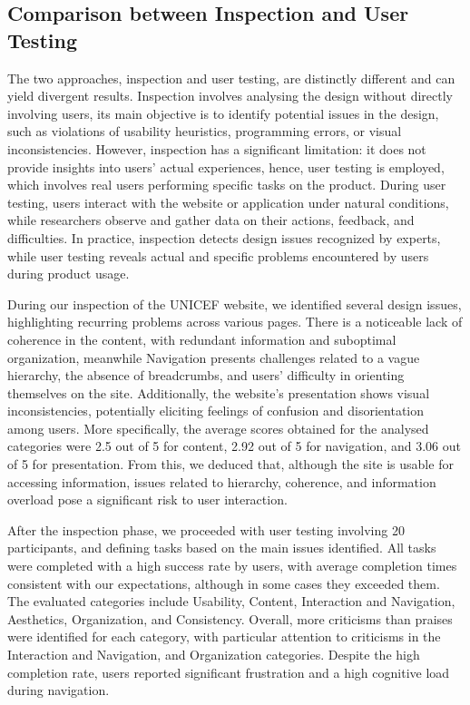 
\subsection{Comparison between Inspection and User Testing}
The two approaches, inspection and user testing, are distinctly different and can yield divergent results. Inspection involves analysing the design without directly involving users, its main objective is to identify potential issues in the design, such as violations of usability heuristics, programming errors, or visual inconsistencies. However, inspection has a significant limitation: it does not provide insights into users' actual experiences, hence, user testing is employed, which involves real users performing specific tasks on the product. During user testing, users interact with the website or application under natural conditions, while researchers observe and gather data on their actions, feedback, and difficulties. 
\newline In practice, inspection detects design issues recognized by experts, while user testing reveals actual and specific problems encountered by users during product usage.
\newline

During our inspection of the UNICEF website, we identified several design issues, highlighting recurring problems across various pages. There is a noticeable lack of coherence in the content, with redundant information and suboptimal organization, meanwhile Navigation presents challenges related to a vague hierarchy, the absence of breadcrumbs, and users' difficulty in orienting themselves on the site. Additionally, the website's presentation shows visual inconsistencies, potentially eliciting feelings of confusion and disorientation among users. More specifically, the average scores obtained for the analysed categories were 2.5 out of 5 for content, 2.92 out of 5 for navigation, and 3.06 out of 5 for presentation. From this, we deduced that, although the site is usable for accessing information, issues related to hierarchy, coherence, and information overload pose a significant risk to user interaction.
\newline

After the inspection phase, we proceeded with user testing involving 20 participants, and defining tasks based on the main issues identified. All tasks were completed with a high success rate by users, with average completion times consistent with our expectations, although in some cases they exceeded them. The evaluated categories include Usability, Content, Interaction and Navigation, Aesthetics, Organization, and Consistency. Overall, more criticisms than praises were identified for each category, with particular attention to criticisms in the Interaction and Navigation, and Organization categories. Despite the high completion rate, users reported significant frustration and a high cognitive load during navigation.
\newline

